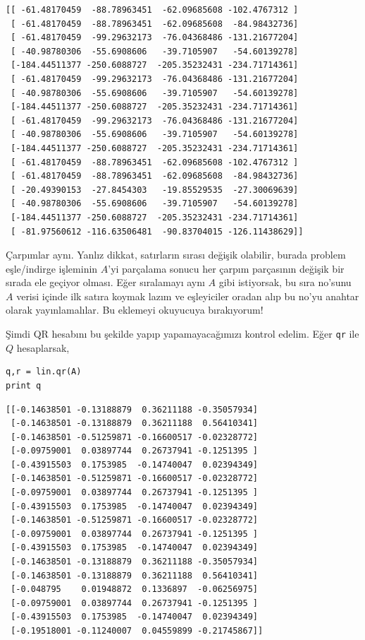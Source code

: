 \documentclass[12pt,fleqn]{article}\usepackage{../../common}
\begin{document}
\begin{verbatim}
[[ -61.48170459  -88.78963451  -62.09685608 -102.4767312 ]
 [ -61.48170459  -88.78963451  -62.09685608  -84.98432736]
 [ -61.48170459  -99.29632173  -76.04368486 -131.21677204]
 [ -40.98780306  -55.6908606   -39.7105907   -54.60139278]
 [-184.44511377 -250.6088727  -205.35232431 -234.71714361]
 [ -61.48170459  -99.29632173  -76.04368486 -131.21677204]
 [ -40.98780306  -55.6908606   -39.7105907   -54.60139278]
 [-184.44511377 -250.6088727  -205.35232431 -234.71714361]
 [ -61.48170459  -99.29632173  -76.04368486 -131.21677204]
 [ -40.98780306  -55.6908606   -39.7105907   -54.60139278]
 [-184.44511377 -250.6088727  -205.35232431 -234.71714361]
 [ -61.48170459  -88.78963451  -62.09685608 -102.4767312 ]
 [ -61.48170459  -88.78963451  -62.09685608  -84.98432736]
 [ -20.49390153  -27.8454303   -19.85529535  -27.30069639]
 [ -40.98780306  -55.6908606   -39.7105907   -54.60139278]
 [-184.44511377 -250.6088727  -205.35232431 -234.71714361]
 [ -81.97560612 -116.63506481  -90.83704015 -126.11438629]]
\end{verbatim}

Çarpımlar aynı. Yanlız dikkat, satırların sırası değişik olabilir, burada
problem eşle/indirge işleminin $A$'yi parçalama sonucu her çarpım parçasının
değişik bir sırada ele geçiyor olması. Eğer sıralamayı aynı $A$ gibi istiyorsak,
bu sıra no'sunu $A$ verisi içinde ilk satıra koymak lazım ve eşleyiciler oradan
alıp bu no'yu anahtar olarak yayınlamalılar. Bu eklemeyi okuyucuya bırakıyorum!

Şimdi QR hesabını bu şekilde yapıp yapamayacağımızı kontrol edelim. Eğer
\verb!qr! ile $Q$ hesaplarsak,

\begin{verbatim}
q,r = lin.qr(A)
print q
\end{verbatim}

\begin{verbatim}
[[-0.14638501 -0.13188879  0.36211188 -0.35057934]
 [-0.14638501 -0.13188879  0.36211188  0.56410341]
 [-0.14638501 -0.51259871 -0.16600517 -0.02328772]
 [-0.09759001  0.03897744  0.26737941 -0.1251395 ]
 [-0.43915503  0.1753985  -0.14740047  0.02394349]
 [-0.14638501 -0.51259871 -0.16600517 -0.02328772]
 [-0.09759001  0.03897744  0.26737941 -0.1251395 ]
 [-0.43915503  0.1753985  -0.14740047  0.02394349]
 [-0.14638501 -0.51259871 -0.16600517 -0.02328772]
 [-0.09759001  0.03897744  0.26737941 -0.1251395 ]
 [-0.43915503  0.1753985  -0.14740047  0.02394349]
 [-0.14638501 -0.13188879  0.36211188 -0.35057934]
 [-0.14638501 -0.13188879  0.36211188  0.56410341]
 [-0.048795    0.01948872  0.1336897  -0.06256975]
 [-0.09759001  0.03897744  0.26737941 -0.1251395 ]
 [-0.43915503  0.1753985  -0.14740047  0.02394349]
 [-0.19518001 -0.11240007  0.04559899 -0.21745867]]
\end{verbatim}
\end{document}
